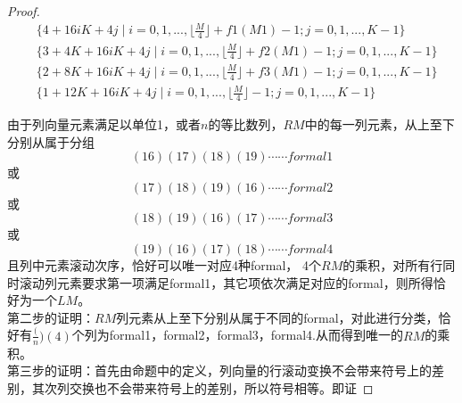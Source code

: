 \documentclass[twoside,a4paper,CCT]{cctart}   %
\begin{document}
\begin{proof}
\begin{equation}\label{5}
\begin{split}
&
\{4+16iK+4j \mid
i=0,1,...,\lfloor \frac{M}{4} \rfloor + f1(M1) -1;
j=0,1,...,K-1\} \\
& \{3+4K+16iK+4j \mid
i=0,1,...,\lfloor \frac{M}{4} \rfloor + f2(M1) -1;
j=0,1,...,K-1\} \\
&
\{2+8K+16iK+4j \mid
i=0,1,...,\lfloor \frac{M}{4} \rfloor + f3(M1) -1;
j=0,1,...,K-1\} \\
&\{1+12K+16iK+4j \mid
i=0,1,...,\lfloor \frac{M}{4} \rfloor -1;
j=0,1,...,K-1\}
\end{split}
\end{equation}

由于列向量元素满足以单位1，或者$n$的等比数列，$RM$中的每一列元素，从上至下分别从属于分组
\begin{equation*}(16)(17)(18)(19)\cdots \cdots formal1\end{equation*}或
\begin{equation*}(17)(18)(19)(16)\cdots \cdots formal2\end{equation*}或
\begin{equation*}(18)(19)(16)(17)\cdots \cdots formal3\end{equation*}或
\begin{equation*}(19)(16)(17)(18)\cdots \cdots formal4\end{equation*}
且列中元素滚动次序，恰好可以唯一对应4种formal，
 4个$RM$的乘积，对所有行同时滚动列元素要求第一项满足formal1，其它项依次满足对应的formal，则所得恰好为一个$LM$。\\
第二步的证明：$RM$列元素从上至下分别从属于不同的formal，对此进行分类，恰好有$\frac(n)(4)$个列为formal1，formal2，formal3，formal4.从而得到唯一的$RM$的乘积。\\
第三步的证明：首先由命题中的定义，列向量的行滚动变换不会带来符号上的差别，其次列交换也不会带来符号上的差别，所以符号相等。即证

\end{proof}
\end{document}
